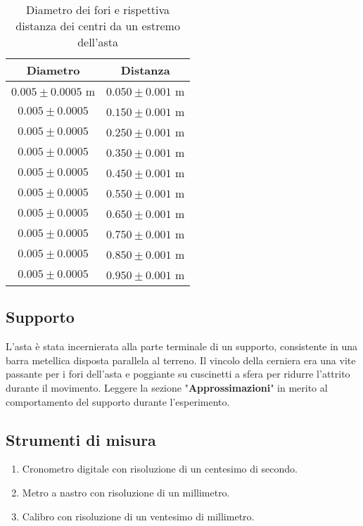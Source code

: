 \documentclass[11pt]{article}
\begin{document}
\begin{table}
    \centering
\caption{Diametro dei fori e rispettiva distanza dei centri da un estremo dell'asta}
    \label{tab:lunghezza-asta}
    \begin{tabular}{|c|c|}
        \hline
        Diametro & Distanza\\
        \hline
         $0.005 \pm 0.0005$ m & $0.050 \pm 0.001$ m \\
        $0.005 \pm 0.0005$ & $0.150 \pm 0.001$ m \\
        $0.005 \pm 0.0005$ & $0.250\pm 0.001$ m \\
        $0.005 \pm 0.0005$ & $0.350 \pm 0.001$ m \\
        $0.005 \pm 0.0005$ & $0.450 \pm 0.001$ m \\
        $0.005 \pm 0.0005$  & $0.550 \pm 0.001$ m \\
        $0.005 \pm 0.0005$ & $0.650 \pm 0.001$ m \\
       $0.005 \pm 0.0005$ & $0.750 \pm 0.001$ m \\
       $0.005 \pm 0.0005$ & $0.850 \pm 0.001$ m \\
        $0.005 \pm 0.0005$ & $0.950 \pm 0.001$ m \\
        \hline
    \end{tabular}
\end{table}

\subsection{Supporto}
L'asta è stata incernierata alla parte terminale di un supporto, consistente in una barra metellica disposta parallela al terreno. 
Il vincolo della cerniera era una vite passante per i fori dell'asta e poggiante su cuscinetti a sfera per ridurre l'attrito durante il movimento.
Leggere la sezione "\textbf{Approssimazioni}" in merito al comportamento del supporto durante l'esperimento.


\subsection{Strumenti di misura}
\begin{enumerate}
\item Cronometro digitale con risoluzione di un centesimo di secondo.
\item Metro a nastro con risoluzione di un millimetro.
\item Calibro con risoluzione di un ventesimo di millimetro.

\end{enumerate}
\end{document}
